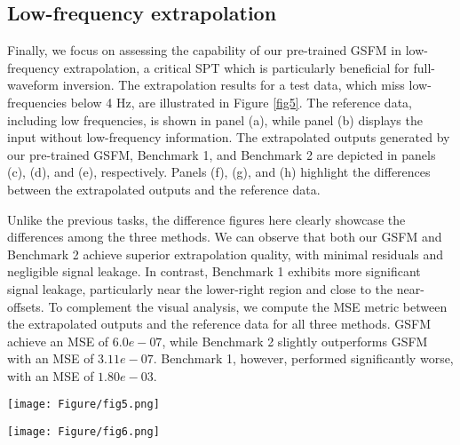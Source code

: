 \subsection{Low-frequency extrapolation}
Finally, we focus on assessing the capability of our pre-trained GSFM in low-frequency extrapolation, a critical SPT which is particularly beneficial for full-waveform inversion. The extrapolation results for a test data, which miss low-frequencies below 4 Hz, are illustrated in Figure \ref{fig5}. The reference data, including low frequencies, is shown in panel (a), while panel (b) displays the input without low-frequency information. The extrapolated outputs generated by our pre-trained GSFM, Benchmark 1, and Benchmark 2 are depicted in panels (c), (d), and (e), respectively. Panels (f), (g), and (h) highlight the differences between the extrapolated outputs and the reference data. 

Unlike the previous tasks, the difference figures here clearly showcase the differences among the three methods. We can observe that both our GSFM and Benchmark 2 achieve superior extrapolation quality, with minimal residuals and negligible signal leakage. In contrast, Benchmark 1 exhibits more significant signal leakage, particularly near the lower-right region and close to the near-offsets. To complement the visual analysis, we compute the MSE metric between the extrapolated outputs and the reference data for all three methods. GSFM achieve an MSE of $6.0e-07$, while Benchmark 2 slightly outperforms GSFM with an MSE of $3.11e-07$. Benchmark 1, however, performed significantly worse, with an MSE of $1.80e-03$. 


\begin{figure*}[htbp]
\centering
\texttt{[image: Figure/fig5.png]}
\caption{Low-frequency extrapolation performance comparison between our pre-trained DSFM and two benchmarks on synthetic data. (a) The labeled and (b) input data, where the input data lacks low frequencies below 4 Hz. The extrapolated products from (c) our GSFM, (d) Benchmark 1, and (e) Benchmark 2. f, g, and h are the corresponding difference between the extrapolated results and the labeled data. }
\label{fig5}
\end{figure*}

\begin{figure*}[htbp]
\centering
\texttt{[image: Figure/fig6.png]}
\caption{Backscattered noise attenuation performance comparison between our fine-tuned DSFM and two benchmarks on field data. (a) The field noisy data contaminated with backscattered noise. The denoised products from (b) our fine-tuned GSFM, (c) Benchmark 1, and (d) Benchmark 2. e, f, and g are he corresponding difference between the denoised results and the field noisy data.}
\label{fig6}
\end{figure*}


